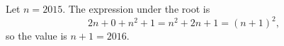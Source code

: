 Let $n=2015$. The expression under the root is
\[
2n+0+n^2+1=n^2+2n+1=(n+1)^2 ,
\]
so the value is $n+1=\boxed{2016}$.
